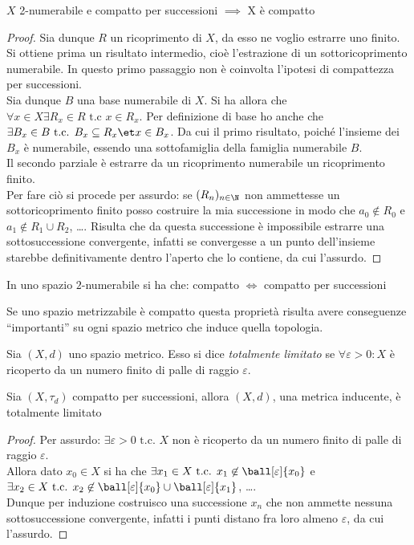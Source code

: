 \begin{prop}
$X$ 2-numerabile e compatto per successioni $\implies$ X è compatto
\end{prop}
\begin{proof}
Sia dunque $R$ un ricoprimento di $X$, da esso ne voglio estrarre uno finito.\\
Si ottiene prima un risultato intermedio, cioè l'estrazione di un sottoricoprimento numerabile. In questo primo passaggio non è coinvolta l'ipotesi di compattezza per successioni.\\
Sia dunque $B$ una base numerabile di $X$. Si ha allora che $\forall x\in X \exists R_x \in R \text{ t.c } x\in R_x$. Per definizione di base ho anche che $\exists B_x \in B \text{ t.c. } B_x \subseteq R_x \et x\in B_x$. Da cui il primo risultato, poiché l'insieme dei $B_x$ è numerabile, essendo una sottofamiglia della famiglia numerabile $B$.\\
Il secondo parziale è estrarre da un ricoprimento numerabile un ricoprimento finito.\\
Per fare ciò si procede per assurdo: se $(R_n)_{n\in \N}$ non ammettesse un sottoricoprimento finito posso costruire la mia successione in modo che $a_0 \not \in R_0$ e $a_1 \not \in R_1 \cup R_2$, \dots . Risulta che da questa successione è impossibile estrarre una sottosuccessione convergente, infatti se convergesse a un punto dell'insieme starebbe definitivamente dentro l'aperto che lo contiene, da cui l'assurdo.
\end{proof}

\begin{cor}
In uno spazio $2$-numerabile si ha che: compatto $\iff$ compatto per successioni
\end{cor}

Se uno spazio metrizzabile è compatto questa proprietà risulta avere conseguenze ``importanti'' su ogni spazio metrico che induce quella topologia.

\begin{defn}
Sia $(X,d)$ uno spazio metrico. Esso si dice \emph{totalmente limitato} se $\forall \varepsilon > 0:X$ è ricoperto da un numero finito di palle di raggio $\varepsilon$.
\end{defn}

\begin{prop}
Sia $(X,\tau _d)$ compatto per successioni, allora $(X,d)$, una metrica inducente, è totalmente limitato
\end{prop}
\begin{proof}
Per assurdo: $\exists \varepsilon > 0 \text{ t.c. } X$ non è ricoperto da un numero finito di palle di raggio $\varepsilon$.\\
Allora dato $x_0 \in X$ si ha che $\exists x_1 \in X \text{ t.c. } x_1 \not \in \ball[\varepsilon]{x_0}$ e $\exists x_2 \in X \text{ t.c. } x_2 \not \in \ball[\varepsilon]{x_0} \cup \ball[\varepsilon]{x_1}$, \dots .\\
Dunque per induzione costruisco una successione $x_n$ che non ammette nessuna sottosuccessione convergente, infatti i punti distano fra loro almeno $\varepsilon$, da cui l'assurdo.
\end{proof}

